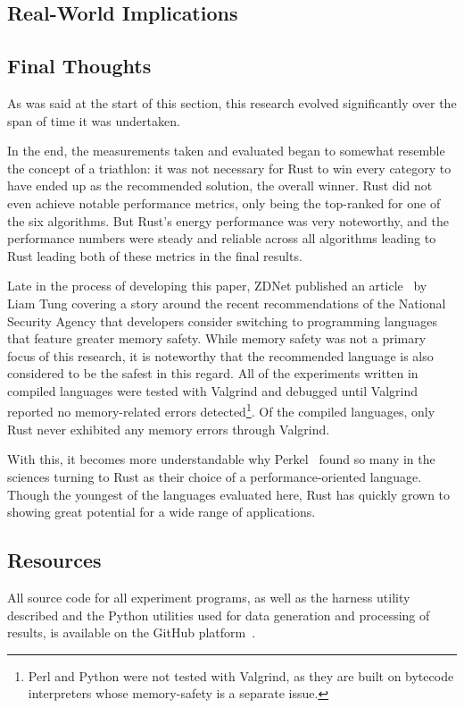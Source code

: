 \subsection{Real-World Implications}

\subsection{Final Thoughts}

As was said at the start of this section, this research evolved significantly over the span of time it was undertaken.

In the end, the measurements taken and evaluated began to somewhat resemble the concept of a triathlon: it was not necessary for Rust to win every category to have ended up as the recommended solution, the overall winner. Rust did not even achieve notable performance metrics, only being the top-ranked for one of the six algorithms. But Rust's energy performance was very noteworthy, and the performance numbers were steady and reliable across all algorithms leading to Rust leading both of these metrics in the final results.

Late in the process of developing this paper, ZDNet published an article~\cite{tung} by Liam Tung covering a story around the recent recommendations of the National Security Agency that developers consider switching to programming languages that feature greater memory safety. While memory safety was not a primary focus of this research, it is noteworthy that the recommended language is also considered to be the safest in this regard. All of the experiments written in compiled languages were tested with Valgrind and debugged until Valgrind reported no memory-related errors detected\footnote{Perl and Python were not tested with Valgrind, as they are built on bytecode interpreters whose memory-safety is a separate issue.}. Of the compiled languages, only Rust never exhibited any memory errors through Valgrind.

With this, it becomes more understandable why Perkel~\cite{nature} found so many in the sciences turning to Rust as their choice of a performance-oriented language. Though the youngest of the languages evaluated here, Rust has quickly grown to showing great potential for a wide range of applications.

\subsection{Resources}

All source code for all experiment programs, as well as the harness utility described and the Python utilities used for data generation and processing of results, is available on the GitHub platform~\cite{github}.
